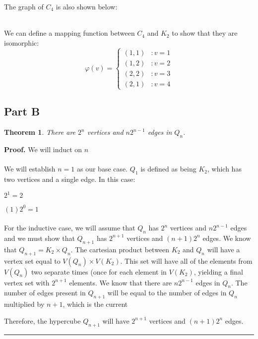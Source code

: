 \documentclass{article}%
\newtheorem{theorem}{Theorem}
\newenvironment{proof}[1][Proof]{\noindent\textbf{#1.} }{\ \rule{0.5em}{0.5em}}
\begin{document}
The graph of $C_4$ is also shown below:

 \\

We can define a mapping function between $C_4$ and $K_2$ to show that they are isomorphic:\\
 \begin{displaymath}
   \varphi(v) = \left\{
     \begin{array}{lr}
         (1, 1) & :v = 1 \\
         (1, 2) & :v = 2 \\
         (2, 2) & :v = 3 \\
         (2, 1) & :v = 4
     \end{array}
   \right.
\end{displaymath}

\subsection{Part B}
\begin{theorem}
    There are $2^n$ vertices and $n2^{n-1}$ edges in $Q_n$.
\end{theorem}

\begin{proof}
    We will induct on $n$\\ \\
    We will establish $n=1$ as our base case. $Q_1$ is defined as being $K_2$, which has two vertices and a single edge. In this case:

    $2^1 = 2$ \checkmark

    $(1)2^0 = 1$ \checkmark \\ \\
    For the inductive case, we will assume that $Q_n$ has $2^n$ vertices and $n2^{n-1}$ edges and we must show that $Q_{n+1}$ has $2^{n+1}$ vertices and $(n+1)2^n$ edges. We know that $Q_{n+1} = K_2 \times Q_n$. The cartesian product between $K_2$ and $Q_n$ will have a vertex set equal to $V(Q_n) \times V(K_2)$. This set will have all of the elements from $V(Q_n)$ two separate times (once for each element in $V(K_2)$, yielding a final vertex set with $2^{n+1}$ elements. We know that there are $n2^{n-1}$ edges in $Q_n$. The number of edges present in $Q_{n+1}$ will be equal to the number of edges in $Q_n$ multiplied by $n + 1$, which is the current

    Therefore, the hypercube $Q_{n+1}$ will have $2^{n+1}$ vertices and $(n+1)2^n$ edges.
\end{proof}
\end{document}
